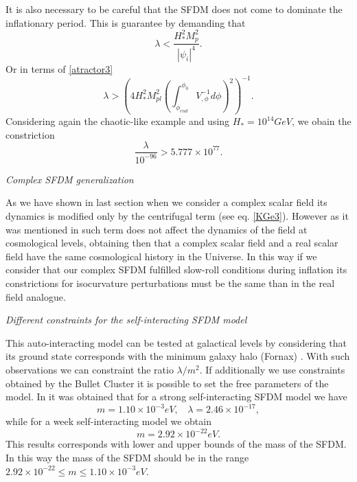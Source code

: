 \documentclass[amssymb,twocolumn,prd,nofootinbib,showpacs]{revtex4-1}
\begin{document}
It is also necessary to be careful that the SFDM does not come to dominate the inflationary period.  This is guarantee by demanding that
\begin{equation}
\lambda < \frac{H_*^2 M_p^2}{|\psi_i|^4}.
\end{equation}
Or in terms of \eqref{atractor3}
\begin{equation}
\lambda>\left(4H_*^2M_{pl}^2\left(\int_{\phi_{end}}^{\phi_0}V_{,\phi}^{-1}d\phi\right)^2\right)^{-1}.
\end{equation}
Considering again the chaotic-like example and using $H_*= 10^{14} GeV$, we obain the constriction
\begin{equation}\label{lowerlambda}
\frac{\lambda}{10^{-96}} > 5.777\times 10^{77}.
\end{equation}
\begin{center}
\textit{Complex SFDM generalization}
\end{center}
As we have shown in last section when we consider a complex scalar field its dynamics is modified only by the centrifugal term (see eq. \eqref{KGe3}). However as it was mentioned in \cite{SFphi42} such term does not affect the dynamics of the field at cosmological levels, obtaining then that a complex scalar field and a real scalar field have the same cosmological history in the Universe. In this way if we consider that our complex SFDM fulfilled slow-roll conditions during inflation its constrictions for isocurvature perturbations must be the same than in the real field analogue. \\
\begin{center}
\textit{Different constraints for the self-interacting SFDM model}
\end{center}

This auto-interacting model can be tested at galactical levels by considering that its ground state corresponds with the minimum galaxy halo (Fornax) \cite{SFphi42}. With such observations we can constraint the ratio $\lambda/m^2$. If additionally we use constraints obtained by the Bullet Cluster \cite{bullet} it is possible to set the free parameters of the model. In \cite{SFphi42} it was obtained that for a strong self-interacting SFDM model we have
\begin{equation}
m= 1.10\times10^{-3}eV, \ \ \ \ \lambda = 2.46\times 10^{-17},
\end{equation}
while for a week self-interacting model we obtain
\begin{equation}
m= 2.92\times 10^{-22}eV.
\end{equation}
This results corresponds with lower and upper bounds of the mass of the SFDM. In this way the mass of the SFDM should be in the range $2.92\times 10^{-22}\leq m\leq 1.10\times 10^{-3}eV$.
\end{document}
